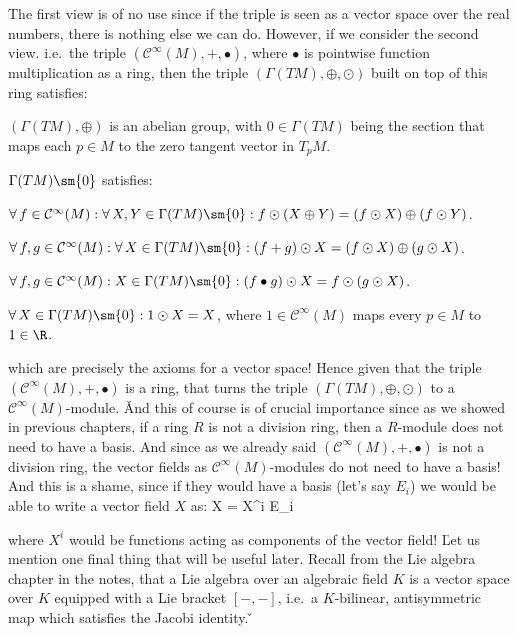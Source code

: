 The first view is of no use since if the triple is seen as a vector space over the real numbers, there is nothing
else we can do. However, if we consider the second view. i.e.\ the triple $(\mathcal{C}^\infty(M),+,\bullet)$, where
$\bullet$ is pointwise function multiplication as a ring, then the triple $(\Gamma(TM),\oplus,\odot)$ built on top of
this ring satisfies:
\bit
\item $(\Gamma(TM),\oplus)$ is an abelian group, with $0\in \Gamma(TM)$ being the section that maps each $p\in M$
to the zero tangent vector in $T_p M$.
\item $\Gamma(TM)\sm\{0\}$ satisfies:
\ben[label=\roman*)]
\item $\forall \, f \in \mathcal{C}^\infty(M) : \forall \, X,Y \in \Gamma(TM) \sm\{0\}: f\odot(X\oplus Y)=(f\odot X)
\oplus (f\odot Y)$.
\item $\forall \, f,g \in \mathcal{C}^\infty(M) : \forall \, X \in \Gamma(TM)\sm\{0\}: (f+g)\odot X= (f \odot X)
\oplus (g \odot X)$.
\item $\forall \, f,g \in \mathcal{C}^\infty(M) : X \in \Gamma(TM)\sm\{0\} : (f\bullet g)\odot X= f \odot (g \odot X)$.
\item $\forall \, X \in \Gamma(TM) \sm\{0\} : 1 \odot X = X$, where $1\in \mathcal{C}^\infty(M)$ maps every $p\in
M$ to $1\in \R$.
\een
\eit

which are precisely the axioms for a vector space! Hence given that the triple $(\mathcal{C}^\infty(M),+,\bullet)$ is
a ring, that turns the triple $(\Gamma(TM),\oplus,\odot)$ to a $\mathcal{C}^\infty(M)$-module. \v

And this of course is of crucial importance since as we showed in previous chapters, if a ring $R$ is not a division
ring, then a $R$-module does not need to have a basis. And since as we already said $(\mathcal{C}^\infty(M),+, \bullet)$
is not a division ring, the vector fields as $\mathcal{C}^\infty(M)$-modules do not need to have a basis! And this is a
shame, since if they would have a basis (let's say $E_i$) we would be able to write a vector field $X$ as:
\bse
X = X^i E_i
\ese

where $X^i$ would be functions acting as components of the vector field! \v

Let us mention one final thing that will be useful later. Recall from the Lie algebra chapter in the notes, that a
Lie algebra over an algebraic field $K$ is a vector space over $K$ equipped with a Lie bracket $[-,-]$, i.e.\ a
$K$-bilinear, antisymmetric map which satisfies the Jacobi identity. \v

